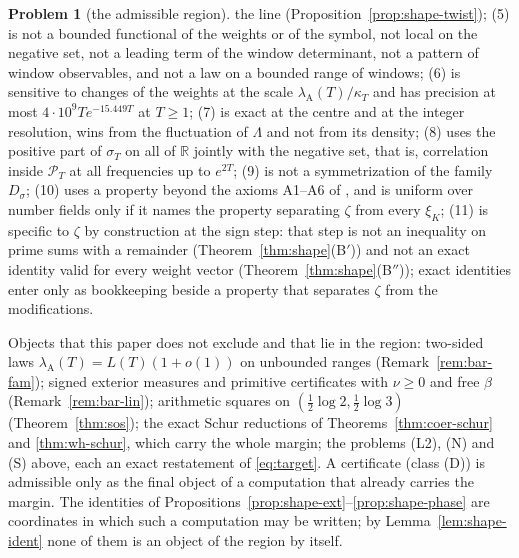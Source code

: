 \documentclass[11pt]{amsart}
\theoremstyle{definition}
\newtheorem{problem}[theorem]{Problem}
\theoremstyle{remark}
\newcommand{\R}{\mathbb R}
\newcommand{\PT}{\mathcal P_T}
\newcommand{\lamA}{\lambda_{\mathrm A}(T)}
\newcommand{\sT}{\sigma_T}
\begin{document}
\begin{enumerate}
\begin{problem}[the admissible region]
the line (Proposition~\ref{prop:shape-twist}); (5) is not a bounded functional of the weights or of the symbol, not local on the
negative set, not a leading term of the window determinant, not a pattern of window observables, and not a law on a bounded range of
windows; (6) is sensitive to changes of the weights at the scale $\lamA/\kappa_T$ and has precision at most $4\cdot10^9Te^{-15.449T}$
at $T\ge1$; (7) is exact at the centre and at the integer resolution, wins from the fluctuation of $\Lambda$ and not from its density;
(8) uses the positive part of $\sT$ on all of $\R$ jointly with the negative set, that is, correlation inside $\PT$ at all frequencies
up to $e^{2T}$; (9) is not a symmetrization of the family $D_\sigma$; (10) uses a property beyond the axioms A1--A6 of \cite{Paper46},
and is uniform over number fields only if it names the property separating $\zeta$ from every $\xi_K$; (11) is specific to $\zeta$ by
construction at the sign step: that step is not an inequality on prime sums with a remainder (Theorem~\ref{thm:shape}(B$'$)) and not an exact
identity valid for every weight vector (Theorem~\ref{thm:shape}(B$''$)); exact identities enter only as bookkeeping beside a property that
separates $\zeta$ from the modifications.
\end{problem}
Objects that this paper does not exclude and that lie in the region: two-sided laws $\lamA=L(T)(1+o(1))$ on unbounded ranges
(Remark~\ref{rem:bar-fam}); signed exterior measures and primitive certificates with $\nu\ge0$ and free $\beta$ (Remark~\ref{rem:bar-lin});
arithmetic squares on $(\frac12\log2,\frac12\log3)$ (Theorem~\ref{thm:sos}); the exact Schur reductions of Theorems~\ref{thm:coer-schur}
and \ref{thm:wh-schur}, which carry the whole margin; the problems (L2), (N) and (S) above, each an exact restatement of
\eqref{eq:target}. A certificate (class (D)) is admissible only as the final object of a computation that already carries the margin.
The identities of Propositions~\ref{prop:shape-ext}--\ref{prop:shape-phase} are coordinates in which such a computation may be written; by
Lemma~\ref{lem:shape-ident} none of them is an object of the region by itself.
\end{enumerate}
\end{document}

